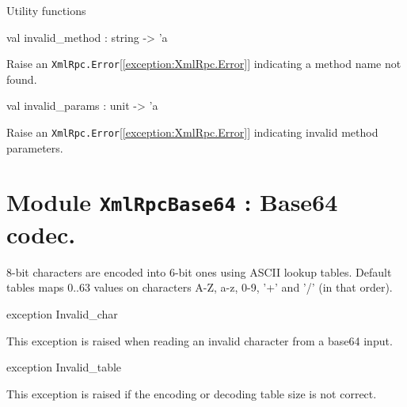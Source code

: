 \documentclass[11pt]{article}
\begin{document}
Utility functions



\label{val:XmlRpcServer.invalid-underscoremethod}\begin{ocamldoccode}
val invalid_method : string -> 'a
\end{ocamldoccode}
\begin{ocamldocdescription}
Raise an {\tt{XmlRpc.Error}}[\ref{exception:XmlRpc.Error}] indicating a method name not found.


\end{ocamldocdescription}




\label{val:XmlRpcServer.invalid-underscoreparams}\begin{ocamldoccode}
val invalid_params : unit -> 'a
\end{ocamldoccode}
\begin{ocamldocdescription}
Raise an {\tt{XmlRpc.Error}}[\ref{exception:XmlRpc.Error}] indicating invalid method parameters.


\end{ocamldocdescription}


\section{Module {\tt{XmlRpcBase64}} : Base64 codec.}
\label{module:XmlRpcBase64}



	8-bit characters are encoded into 6-bit ones using ASCII lookup tables.
	Default tables maps 0..63 values on characters A-Z, a-z, 0-9, '+' and '/'
	(in that order).



\ocamldocvspace{0.5cm}



\label{exception:XmlRpcBase64.Invalid-underscorechar}\begin{ocamldoccode}
exception Invalid_char
\end{ocamldoccode}
\begin{ocamldocdescription}
This exception is raised when reading an invalid character
	from a base64 input.


\end{ocamldocdescription}




\label{exception:XmlRpcBase64.Invalid-underscoretable}\begin{ocamldoccode}
exception Invalid_table
\end{ocamldoccode}
\begin{ocamldocdescription}
This exception is raised if the encoding or decoding table
	size is not correct.


\end{ocamldocdescription}
\end{document}
